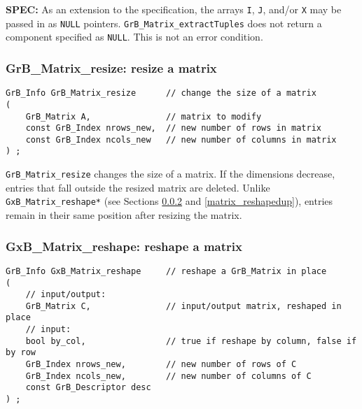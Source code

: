 \documentclass[12pt]{article}
\begin{document}
\begin{alert}
{\bf SPEC:} As an extension to the specification, the arrays \verb'I', \verb'J', and/or
\verb'X' may be passed in as \verb'NULL' pointers.
\verb'GrB_Matrix_extractTuples' does not return a component specified as
\verb'NULL'.  This is not an error condition.
\end{alert}

\subsubsection{{\sf GrB\_Matrix\_resize:}          resize a matrix}
\label{matrix_resize}

\begin{mdframed}[userdefinedwidth=6in]
{\footnotesize
\begin{verbatim}
GrB_Info GrB_Matrix_resize      // change the size of a matrix
(
    GrB_Matrix A,               // matrix to modify
    const GrB_Index nrows_new,  // new number of rows in matrix
    const GrB_Index ncols_new   // new number of columns in matrix
) ;
\end{verbatim} } \end{mdframed}

\verb'GrB_Matrix_resize' changes the size of a matrix.  If the dimensions
decrease, entries that fall outside the resized matrix are deleted.  Unlike
\verb'GxB_Matrix_reshape*' (see Sections \ref{matrix_reshape} and
\ref{matrix_reshapedup}), entries remain in their same position after resizing
the matrix.

\newpage
\subsubsection{{\sf GxB\_Matrix\_reshape:} reshape a matrix}
\label{matrix_reshape}

\begin{mdframed}[userdefinedwidth=6in]
{\footnotesize
\begin{verbatim}
GrB_Info GxB_Matrix_reshape     // reshape a GrB_Matrix in place
(
    // input/output:
    GrB_Matrix C,               // input/output matrix, reshaped in place
    // input:
    bool by_col,                // true if reshape by column, false if by row
    GrB_Index nrows_new,        // new number of rows of C
    GrB_Index ncols_new,        // new number of columns of C
    const GrB_Descriptor desc
) ;
\end{verbatim} } \end{mdframed}
\end{document}
